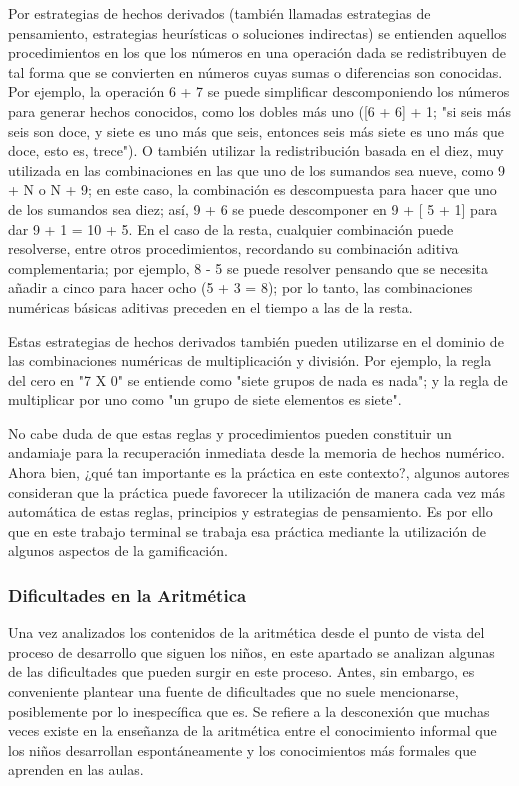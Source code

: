 \documentclass{article}
\begin{document}
Por estrategias de hechos derivados (también llamadas estrategias de pensamiento, estrategias heurísticas o soluciones indirectas) se entienden aquellos procedimientos en los que los números en una operación dada se redistribuyen de tal forma que se convierten en números cuyas sumas o diferencias son conocidas. Por ejemplo, la operación 6 + 7 se puede simplificar descomponiendo los números para generar hechos conocidos, como los dobles más uno ([6 + 6] + 1; "si seis más seis son doce, y siete es uno más que seis, entonces seis más siete es uno más que doce, esto es, trece"). O también utilizar la redistribución basada en el diez, muy utilizada en las combinaciones en las que uno de los sumandos sea nueve, como 9 + N o N + 9; en este caso, la combinación es descompuesta para hacer que uno de los sumandos sea diez; así, 9 + 6 se puede descomponer en 9 + [ 5 + 1] para dar 9 + 1 = 10 + 5. En el caso de la resta, cualquier combinación puede resolverse, entre otros procedimientos, recordando su combinación aditiva complementaria; por ejemplo, 8 - 5 se puede resolver pensando que se necesita añadir a cinco para hacer ocho (5 + 3 = 8); por lo tanto, las combinaciones numéricas básicas aditivas preceden en el tiempo a las de la resta.

Estas estrategias de hechos derivados también pueden utilizarse en el dominio de las combinaciones numéricas de multiplicación y división. Por ejemplo, la regla del cero en "7 X 0" se entiende como "siete grupos de nada es nada"; y la regla de multiplicar por uno como "un grupo de siete elementos es siete".

No cabe duda de que estas reglas y procedimientos pueden constituir un andamiaje para la recuperación inmediata desde la memoria de hechos numérico. Ahora bien, ¿qué tan importante es la práctica en este contexto?, algunos autores \cite{orrantia2002dificultades} consideran que  la práctica  puede favorecer la utilización de manera cada vez más automática de estas reglas, principios y estrategias de pensamiento. Es por ello que en este trabajo terminal se trabaja esa práctica mediante la utilización de algunos aspectos de la gamificación.

\subsubsection{Dificultades en la Aritmética} 
Una vez analizados los contenidos de la aritmética desde el punto de vista del proceso de desarrollo que siguen los niños, en este apartado se analizan algunas de las dificultades que pueden surgir en este proceso. Antes, sin embargo, es conveniente  plantear una fuente de dificultades que no suele mencionarse, posiblemente por lo inespecífica que es. Se refiere a la desconexión que muchas veces existe en la enseñanza de la aritmética entre el conocimiento informal que los niños desarrollan espontáneamente y los conocimientos más formales que aprenden en las aulas.
\end{document}
